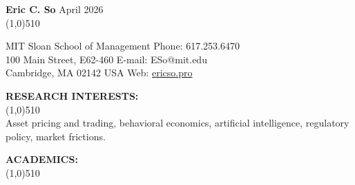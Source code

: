 \documentclass[11pt]{article}
\begin{document}
\setlength{\parindent}{0in}
{\bf \LARGE Eric C. So}  \hfill April 2026\\
\vskip -0.8cm \line(1,0){510} \\ \vskip -0.35cm

MIT Sloan School of Management  \hfill Phone:  617.253.6470\\            
100 Main Street, E62-460    \hfill  E-mail:  ESo@mit.edu\\         
Cambridge, MA  02142 USA \hfill    Web: \href{https://ericso.pro}{ericso.pro}\\
\vskip -0.5cm


\vskip 0.75cm
\setlength{\parindent}{0in}
{\bf RESEARCH INTERESTS:\\}
\vskip -0.85cm \line(1,0){510} \\
\setlength{\parindent}{0.5in}
Asset pricing and trading, behavioral economics, artificial intelligence, regulatory policy, market frictions.

\vskip 0.75cm
\setlength{\parindent}{0in}
{\bf ACADEMICS:\\}
\vskip -0.85cm \line(1,0){510} \\ \vskip -0.5cm
\end{document}
